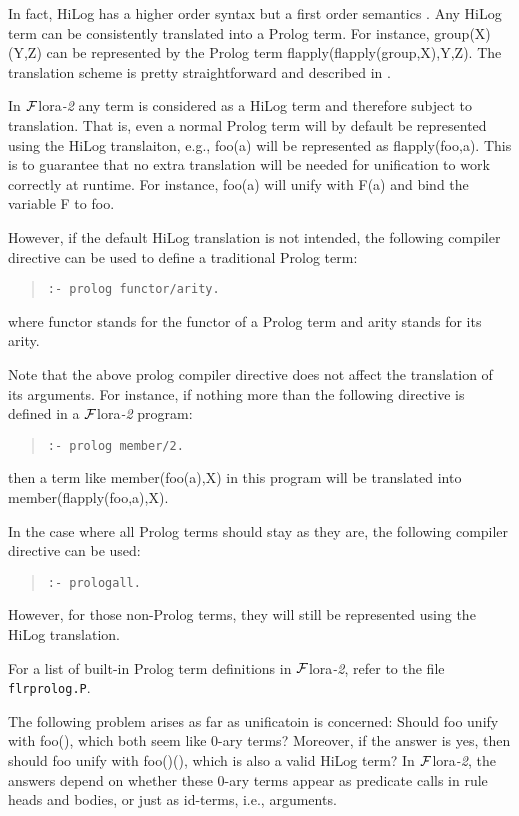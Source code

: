 \documentclass[11pt]{article}
\newcommand{\FLORA}{{\mbox{${\cal F}${\sc lora}\rm\emph{-2}}}\xspace}
\begin{document}
%
In fact, HiLog has a higher order syntax but a first order semantics
\cite{hilog-jlp}. Any HiLog term can be consistently translated into
a Prolog term. For instance, {\sf group(X)(Y,Z)} can be represented
by the Prolog term {\sf flapply(flapply(group,X),Y,Z)}. The translation
scheme is pretty straightforward and described in \cite{hilog-jlp}.

In \FLORA any term is considered as a HiLog term and therefore subject
to translation. That is, even a normal Prolog term will by default be
represented using the HiLog translaiton, e.g., {\sf foo(a)} will be
represented as {\sf flapply(foo,a)}. This is to guarantee that no
extra translation will be needed for unification to work correctly at
runtime. For instance, {\sf foo(a)} will unify with {\sf F(a)} and
bind the variable {\sf F} to {\sf foo}.

%
However, if the default HiLog translation is not intended, the following
compiler directive can be used to define a traditional Prolog term:
\begin{quote}
\verb|:- prolog functor/arity.|
\end{quote}
where {\sf functor} stands for the functor of a Prolog term and
{\sf arity} stands for its arity.

Note that the above {\sf prolog} compiler directive does not affect
the translation of its arguments. For instance, if nothing more than
the following directive is defined in a \FLORA program:
\begin{quote}
\verb|:- prolog member/2.|
\end{quote}
then a term like {\sf member(foo(a),X)} in this program will be translated
into {\sf member(flapply(foo,a),X)}.

%
In the case where all Prolog terms should stay as they are, the following
compiler directive can be used:
\begin{quote}
\verb|:- prologall.|
\end{quote}
However, for those non-Prolog terms, they will still be represented using
the HiLog translation.

For a list of built-in Prolog term definitions in \FLORA, refer to the
file {\tt flrprolog.P}.

%
The following problem arises as far as unificatoin is concerned:
Should {\sf foo} unify with {\sf foo()}, which both seem like 0-ary
terms? Moreover, if the answer is yes, then should {\sf foo} unify
with {\sf foo()()}, which is also a valid HiLog term?  In \FLORA, the
answers depend on whether these 0-ary terms appear as predicate calls
in rule heads and bodies, or just as id-terms, i.e., arguments.
\end{document}
